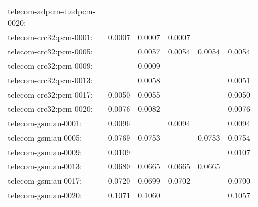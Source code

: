 \begin{longtable}{lrrrrr}
telecom-adpcm-d:adpcm-0020: & \color{Green}{0.0051} & \color{Green}{0.0051} & \color{Green}{0.0051} & \color{Green}{0.0051} & \color{Green}{0.0051} \\
telecom-crc32:pcm-0001: & 0.0007 & 0.0007 & 0.0007 & \color{Green}{0.0006} & \color{Green}{0.0006} \\
telecom-crc32:pcm-0005: & \color{Green}{0.0053} & 0.0057 & 0.0054 & 0.0054 & 0.0054 \\
telecom-crc32:pcm-0009: & \color{Green}{0.0008} & 0.0009 & \color{Green}{0.0008} & \color{Green}{0.0008} & \color{Green}{0.0008} \\
telecom-crc32:pcm-0013: & \color{Green}{0.0049} & 0.0058 & \color{Green}{0.0049} & \color{Green}{0.0049} & 0.0051 \\
telecom-crc32:pcm-0017: & 0.0050 & 0.0055 & \color{Green}{0.0047} & \color{Green}{0.0047} & 0.0050 \\
telecom-crc32:pcm-0020: & 0.0076 & 0.0082 & \color{Green}{0.0072} & \color{Green}{0.0072} & 0.0076 \\
telecom-gsm:au-0001: & 0.0096 & \color{Green}{0.0093} & 0.0094 & \color{Green}{0.0093} & 0.0094 \\
telecom-gsm:au-0005: & 0.0769 & 0.0753 & \color{Green}{0.0752} & 0.0753 & 0.0754 \\
telecom-gsm:au-0009: & 0.0109 & \color{Green}{0.0106} & \color{Green}{0.0106} & \color{Green}{0.0106} & 0.0107 \\
telecom-gsm:au-0013: & 0.0680 & 0.0665 & 0.0665 & 0.0665 & \color{Green}{0.0662} \\
telecom-gsm:au-0017: & 0.0720 & 0.0699 & 0.0702 & \color{Green}{0.0697} & 0.0700 \\
telecom-gsm:au-0020: & 0.1071 & 0.1060 & \color{Green}{0.1050} & \color{Green}{0.1050} & 0.1057 \\
\end{longtable}
